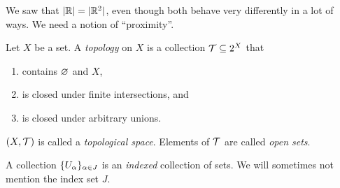 We saw that $\lvert\mathbb{R}\rvert = \lvert\mathbb{R}^2\rvert$, even though both behave very
differently in a lot of ways.
We need a notion of ``proximity''.

\begin{definition*}[Topology] \label{def:topo}
    Let $X$ be a set.
    A \emph{topology} on $X$ is a collection $\mathcal{T} \subseteq 2^X$ that
    \begin{enumerate}[label=\small(T\arabic*)]
        \item contains $\varnothing$ and $X$,
        \item is closed under finite intersections, and
        \item is closed under arbitrary unions.
    \end{enumerate}
    $(X, \mathcal{T})$ is called a \emph{topological space}.
    Elements of $\mathcal{T}$ are called \emph{open sets}.
\end{definition*}

\begin{remark}
    A collection $\{U_\alpha\}_{\alpha \in J}$ is an \emph{indexed}
    collection of sets.
    We will sometimes not mention the index set $J$.
\end{remark}

